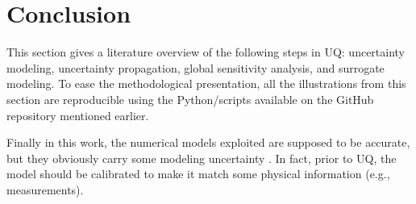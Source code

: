 \section{Conclusion}

This section gives a literature overview of the following steps in UQ: uncertainty modeling, uncertainty propagation, global sensitivity analysis, and surrogate modeling. 
To ease the methodological presentation, all the illustrations from this section are reproducible using the Python/\ot scripts available on the GitHub repository mentioned earlier. 

Finally in this work, the numerical models exploited are supposed to be accurate, but they obviously carry some modeling uncertainty \citep{oberkampf_2010_VVUQ}. 
In fact, prior to UQ, the model should be calibrated \citep{ghanem_2017} to make it match some physical information (e.g., measurements). 
